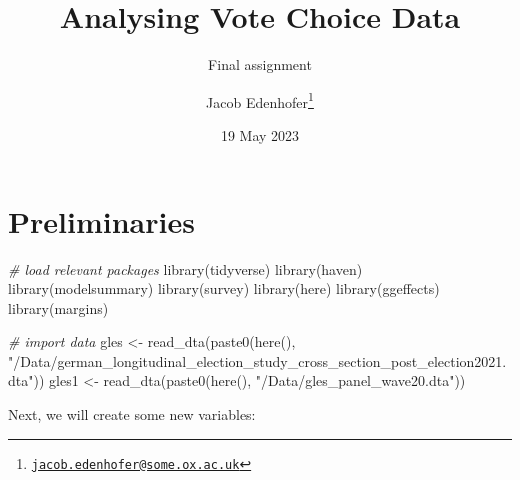 \documentclass[
]{article}
\title{Analysing Vote Choice Data}
\subtitle{Final assignment}
\author{Jacob Edenhofer\footnote{\href{mailto:jacob.edenhofer@some.ox.ac.uk}{\nolinkurl{jacob.edenhofer@some.ox.ac.uk}}}}
\date{19 May 2023}
\newenvironment{Shaded}{\begin{snugshade}}{\end{snugshade}}
\newcommand{\CommentTok}[1]{\textcolor[rgb]{0.56,0.35,0.01}{\textit{#1}}}
\newcommand{\FunctionTok}[1]{\textcolor[rgb]{0.00,0.00,0.00}{#1}}
\newcommand{\NormalTok}[1]{#1}
\newcommand{\OtherTok}[1]{\textcolor[rgb]{0.56,0.35,0.01}{#1}}
\newcommand{\StringTok}[1]{\textcolor[rgb]{0.31,0.60,0.02}{#1}}
\begin{document}
\maketitle

\hypertarget{preliminaries}{%
\section{Preliminaries}\label{preliminaries}}

\begin{Shaded}
\begin{Highlighting}[]
\CommentTok{\# load relevant packages }
\FunctionTok{library}\NormalTok{(tidyverse)}
\FunctionTok{library}\NormalTok{(haven)}
\FunctionTok{library}\NormalTok{(modelsummary)}
\FunctionTok{library}\NormalTok{(survey)}
\FunctionTok{library}\NormalTok{(here)}
\FunctionTok{library}\NormalTok{(ggeffects)}
\FunctionTok{library}\NormalTok{(margins)}

\CommentTok{\# import data }
\NormalTok{gles }\OtherTok{\textless{}{-}} \FunctionTok{read\_dta}\NormalTok{(}\FunctionTok{paste0}\NormalTok{(}\FunctionTok{here}\NormalTok{(), }\StringTok{"/Data/german\_longitudinal\_election\_study\_cross\_section\_post\_election2021.dta"}\NormalTok{))}
\NormalTok{gles1 }\OtherTok{\textless{}{-}} \FunctionTok{read\_dta}\NormalTok{(}\FunctionTok{paste0}\NormalTok{(}\FunctionTok{here}\NormalTok{(), }\StringTok{"/Data/gles\_panel\_wave20.dta"}\NormalTok{))}
\end{Highlighting}
\end{Shaded}

Next, we will create some new variables:
\end{document}

